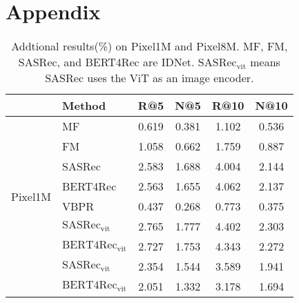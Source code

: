 \documentclass[sigconf]{acmart}
\begin{document}
\vspace{12em}

\appendix

\section{Appendix}

\begin{table}[ht]
	\centering

		\centering
		\caption{Addtional results(\%) on Pixel1M and Pixel8M. MF, FM, SASRec, and BERT4Rec are IDNet.
			$\text{SASRec}_\text{vit}$ means SASRec uses the ViT as an image encoder.}
		\label{tab:benchmark_large}
		
		\setlength{\tabcolsep}{7pt}
		\begin{tabular}{ll c c c c }
			\toprule
			&Method  & R@5 &  N@5 & R@10 &  N@10    \\
			\midrule
			\multirow{8}{*}{Pixel1M}&MF & 0.619 & 0.381 & 1.102 & 0.536\\
			&FM & 1.058 & 0.662 & 1.759 & 0.887\\ 
			&SASRec & 2.583 & 1.688 & 4.004 & 2.144 \\
			&BERT4Rec & 2.563 & 1.655 & 4.062 & 2.137 \\
			\cmidrule(r){2-6}
			&VBPR& 0.437 & 0.268 & 0.773 & 0.375 \\
			\cmidrule(r){2-6}
			&$\text{SASRec}_\text{vit}$ & 2.765 & 1.777 & 4.402 & 2.303 \\
			&$\text{BERT4Rec}_\text{vit}$ & 2.727 & 1.753 & 4.343 & 2.272  \\	
			\midrule
			\multirow{2}{*}{Pixel8M} 

   &$\text{SASRec}_\text{vit}$ & 2.354 & 1.544 & 3.589 & 1.941 \\
			&$\text{BERT4Rec}_\text{vit}$ & 2.051 & 1.332 & 3.178 & 1.694 \\
			\bottomrule
		\end{tabular}
		\end{table}
\end{document}

